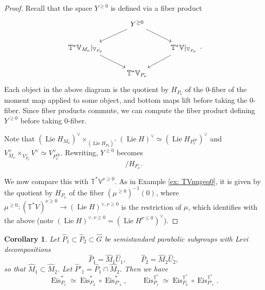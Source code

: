 \documentclass{amsart}
\newtheorem{corollary}[theorem]{Corollary}
\theoremstyle{definition}
\theoremstyle{remark}
\numberwithin{equation}{section}
\DeclareMathOperator{\Lie}{Lie}
\newcommand{\op}{\mathrm{op}}
\newcommand{\wh}{\widehat}
\DeclareMathOperator{\Eis}{\mathrm{Eis}}
\newcommand{\V}{\mathbb{V}}
\newcommand{\T}{\mathbb{T}}
\begin{document}
\begin{proof}
Recall that the space $Y^{\geq 0}$ is defined via a fiber product
\begin{equation*}
    \begin{tikzcd}
        & Y^{\geq 0}  \arrow[dl] \arrow[dr]& \\
        \T^{\ast}\V_{M_\nu}|_{\V_{P_\nu}} \arrow[dr] & & \T^{\ast}\V|_{\V_{P_\nu}}\arrow[dl] \\
        & \T^{\ast} \V_{P_\nu} &
    \end{tikzcd}.
\end{equation*}
Each object in the above diagram is the quotient by $H_{P_\nu}$ of the $0$-fiber of the moment map applied to some object, and bottom maps lift before taking the $0$-fiber. Since fiber products commute, we can compute the fiber product defining $Y^{\geq 0}$ before taking $0$-fiber.

Note that $(\Lie H_{M_\nu})^\vee \times_{(\Lie H_{P_\nu})^\vee} (\Lie H)^\vee \simeq (\Lie H_{P_\nu^{\op}})^\vee$ and $V^\vee_{M_\nu} \times_{ V^\vee_{P_\nu}} V^\vee \simeq V^\vee_{P_\nu^{\op}}$. Rewriting, $Y^{ \geq 0}$ becomes
\begin{equation*}
    [\{0\} \times_{(\Lie H_{P_\nu^{\op}})^\vee} (V_{P_\nu} \times V^\vee_{P_\nu^{\op}})] / H_{P_\nu}.
\end{equation*}

We now compare this with $\T^{\ast} \V^{\nu \geq 0}$. As in Example \ref{ex: TVnugeq0}, it is given by the quotient by $H_{P_\nu}$ of the fiber $(\mu^{\geq 0})^{-1}(0)$, where $\mu^{\geq 0}: (\T^{\ast}V)^{\nu \geq 0} \rightarrow (\Lie H)^{\vee, \nu \geq 0}$ is the restriction of $\mu$, which identifies with the above (note $(\Lie H)^{\vee, \nu \geq 0} = (\Lie H^{\nu \leq 0})^\vee$).
\end{proof}
\begin{corollary}{\label{cor: eiscompositioncotan}}
Let $\wh{P}_1 \subset \wh{P}_2 \subset \wh{G}$ be semistandard  parabolic subgroups with Levi decompositions
\begin{equation*}
    \wh{P}_1 = \wh{M}_1\wh{U}_1, \qquad \wh{P}_2 = \wh{M}_2\wh{U}_2,
\end{equation*}
so that $\wh{M}_1 \subset \wh{M}_2$. Let $\wh{P}'_1 = \wh{P}_1 \cap \wh{M}_2$. Then we have
\begin{equation*}
    \Eis^{\ast}_{P_1} \simeq \Eis^{\ast}_{P_2} \circ \Eis^{\ast}_{P'_1}, \qquad   \Eis^{\T^{\ast}}_{P_1} \simeq \Eis^{\T^{\ast}}_{P_2} \circ \Eis^{\T^{\ast}}_{P'_1}.
\end{equation*}
\end{corollary}
\end{document}
